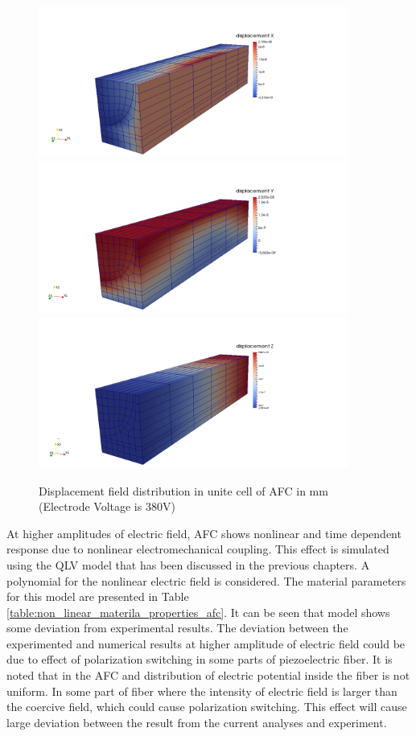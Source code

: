 \begin{figure}
\centering
{}
{\includegraphics[width=4in]{./chap_4_structural_analyses/afc_unit_cell/afc_displacement_x.png}}
{\includegraphics[width=4in]{./chap_4_structural_analyses/afc_unit_cell/afc_displacement_y.png}}
{\includegraphics[width=4in]{./chap_4_structural_analyses/afc_unit_cell/afc_displacement_z.png}}
\caption{Displacement field distribution in unite cell of AFC in mm (Electrode Voltage is 380V)}
\label{afc_displacement_all:fig}
\end{figure}

At higher amplitudes of electric field, AFC shows nonlinear and time dependent response due to nonlinear electromechanical coupling. 
This effect is simulated using the QLV model that has been discussed in the previous chapters. 
A polynomial for the nonlinear electric field is considered. 
The material parameters for this model are presented in Table \ref{table:non_linear_materila_properties_afc}.
It can be seen that model shows some deviation from experimental results.
The deviation between the experimented and numerical results at higher amplitude of electric field could be due to effect of polarization switching in some parts of piezoelectric fiber.
It is noted that in the AFC and distribution of electric potential inside the fiber is not uniform.
In some part of fiber where the intensity of electric field is larger than the coercive field, which could cause polarization switching.
This effect will cause large deviation between the result from the current analyses and experiment.


